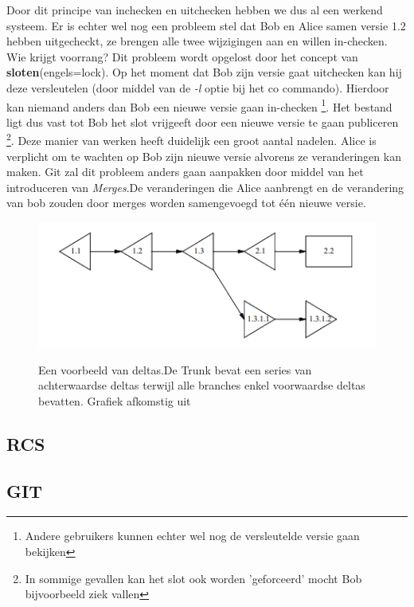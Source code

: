 Door dit principe van inchecken en uitchecken hebben we dus al een werkend systeem. Er is echter wel nog een probleem stel dat Bob en Alice samen versie 1.2 hebben uitgecheckt, ze brengen alle twee wijzigingen aan en willen in-checken. Wie krijgt voorrang? Dit probleem wordt opgelost door het concept van \textbf{sloten}(engels=lock). Op het moment dat  Bob zijn versie gaat uitchecken kan hij deze versleutelen (door middel van de \textit{-l} optie bij het co commando). Hierdoor kan niemand anders dan Bob een nieuwe versie gaan in-checken \footnote{Andere gebruikers kunnen echter wel nog de versleutelde versie gaan bekijken}. Het bestand ligt dus vast tot Bob het slot vrijgeeft door een nieuwe versie te gaan publiceren \footnote{In sommige gevallen kan het slot ook worden 'geforceerd' mocht Bob bijvoorbeeld ziek vallen}. Deze manier van werken heeft duidelijk een groot aantal nadelen. Alice is verplicht om te wachten op Bob zijn nieuwe versie alvorens ze veranderingen kan maken. Git zal dit probleem anders gaan aanpakken door middel van het introduceren van \textit{Merges}.De veranderingen die Alice aanbrengt en de verandering van bob zouden door merges worden samengevoegd tot één nieuwe versie.\\

\label{par:branches}

\begin{figure}[h!]
\centering
  	\includegraphics[scale=1.0]{deltas.png}
	\label{fig:deltas}
\caption[Voorbeeld van deltas.]{Een voorbeeld van deltas.De Trunk bevat een series van achterwaardse deltas terwijl alle branches enkel voorwaardse deltas bevatten. Grafiek afkomstig uit \textcite{Tichy85rcs}}
\end{figure}
\subsection{RCS}
\subsection{GIT}
\label{sec:GIT}
